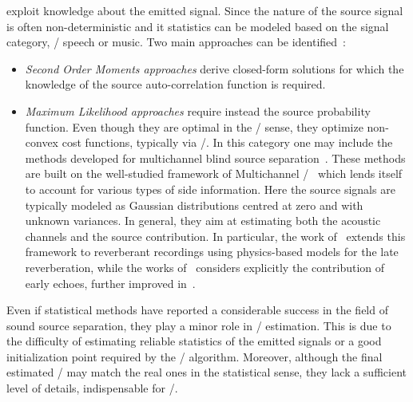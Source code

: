  exploit knowledge about the emitted signal.
Since the nature of the source signal is often non-deterministic and it statistics can be modeled based on the signal category, \eg/ speech or music.
Two main approaches can be identified~:
\begin{itemize}
    \item \textit{Second Order Moments approaches} derive closed-form solutions for which the knowledge of the source auto-correlation function is required.
    \item \textit{Maximum Likelihood approaches} require instead the source probability function.
    Even though they are optimal in the \ML/ sense, they optimize non-convex cost functions, typically via \EMdef/.
    In this category one may include the methods developed for multichannel blind source separation~.
    These methods are built on the well-studied framework of Multichannel \NMF/~ which lends itself to account for various types of side information.
    Here the source signals are typically modeled as Gaussian distributions centred at zero and with unknown variances.
    In general, they aim at estimating both the acoustic channels and the source contribution.
    In particular, the work of~ extends this framework to reverberant recordings using physics-based models for the late reverberation, while the works of~ considers explicitly the contribution of early echoes, further improved in~.
\end{itemize}
Even if statistical methods have reported a considerable success in the field of sound source separation, they play a minor role in \RIR/ estimation.
This is due to the difficulty of estimating reliable statistics of the emitted signals or a good initialization point required by the \EM/ algorithm.
Moreover, although the final estimated \RIRs/ may match the real ones in the statistical sense, they lack a sufficient level of details, indispensable for \AER/.


